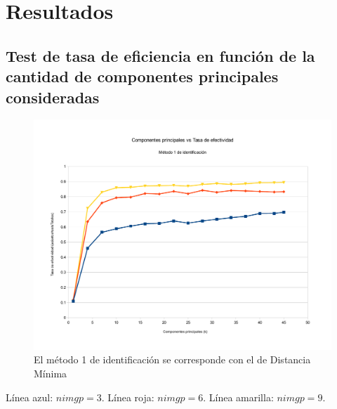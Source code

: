 \section{Resultados}

\subsection{Test de tasa de eficiencia en función de la cantidad de componentes principales consideradas}
\begin{figure}[H]{}
\centering
\includegraphics[scale=0.5]{graphs/componentesPrincipalesVsTasaDeEfectividadM1.pdf}
\caption{El método 1 de identificación se corresponde con el de Distancia Mínima}
\label{CPvsTE}
\end{figure}

Línea azul: $nimgp = 3$. Línea roja: $nimgp = 6$. Línea amarilla: $nimgp = 9$.

